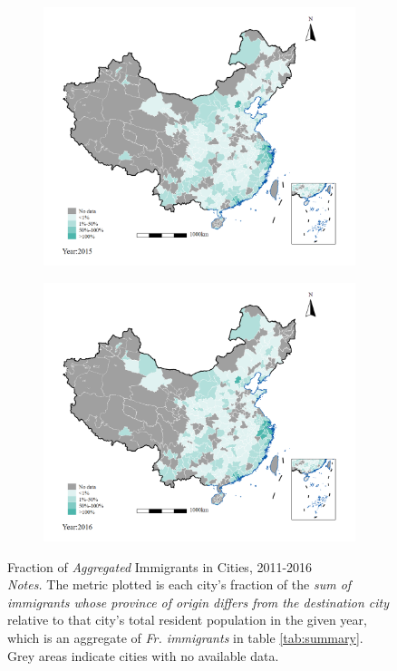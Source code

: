 \documentclass[12pt]{article}
\begin{document}
\begin{figure}[!htbp]
\begin{subfigure}{0.45\textwidth}
        \label{fig:2014}
    \end{subfigure}
    \hfill
    \begin{subfigure}{0.45\textwidth}
        \centering
        \includegraphics[width=\textwidth]{../Analysis/output/figure_immgrants_share_2015.png}
        \label{fig:2015}
    \end{subfigure}
    \hfill
    \begin{subfigure}{0.45\textwidth}
        \centering
        \includegraphics[width=\textwidth]{../Analysis/output/figure_immgrants_share_2016.png}
        \label{fig:2016}
    \end{subfigure}
    \caption{Fraction of \emph{Aggregated} Immigrants in Cities, 2011-2016 \vspace{1ex} \\ 
    {\footnotesize \emph{Notes.} The metric plotted is each city's fraction of the \emph{sum of immigrants whose province of origin differs from the destination city} relative to that city's total resident population in the given year, which is an aggregate of \emph{Fr. immigrants} in table \ref{tab:summary}. Grey areas indicate cities with no available data.}}
   \label{fig:combined_figure_summary}
\end{figure}
\end{document}
